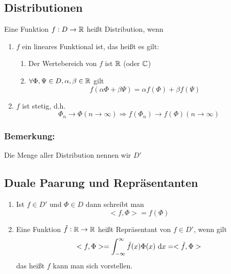 \subsection{Distributionen}
Eine Funktion $f: D \to \mathbb{R}$ heißt Distribution, wenn
\begin{enumerate}
    \item $f$ ein lineares Funktional ist, das heißt es gilt:
        \begin{enumerate}
            \item Der Wertebereich von $f$ ist $\mathbb{R}$ (oder $\mathbb{C}$)
            \item $\forall \Phi, \Psi \in D, \alpha, \beta \in \mathbb{R}$ gilt
                \begin{equation*}
                    f(\alpha \Phi + \beta \Psi) = \alpha f(\Phi) + \beta f(\Psi)
                \end{equation*}
        \end{enumerate}
    \item $f$ ist stetig, d.h.
        \begin{equation}
            \Phi_n \to \Phi (n \to \infty) \Rightarrow f(\Phi_n) \to f(\Phi) (n \to \infty)
        \end{equation}
\end{enumerate}

\subsubsection{Bemerkung:}
Die Menge aller Distribution nennen wir $D'$

\subsection{Duale Paarung und Repräsentanten}
\begin{enumerate}
    \item Ist $f \in D'$ und $\Phi \in D$ dann schreibt man
        \begin{equation*}
            <f, \Phi> = f(\Phi)
        \end{equation*}
    \item Eine Funktion $\tilde{f}: \mathbb{R} \to \mathbb{R}$ heißt Repräsentant von $f \in D'$, wenn gilt
        \begin{equation*}
            <f, \Phi> = \int_{-\infty}^\infty \tilde{f}(x) \Phi(x) \text{ d}x = <\tilde{f}, \Phi>
        \end{equation*}
    das heißt $f$ kann man sich vorstellen.
\end{enumerate}
